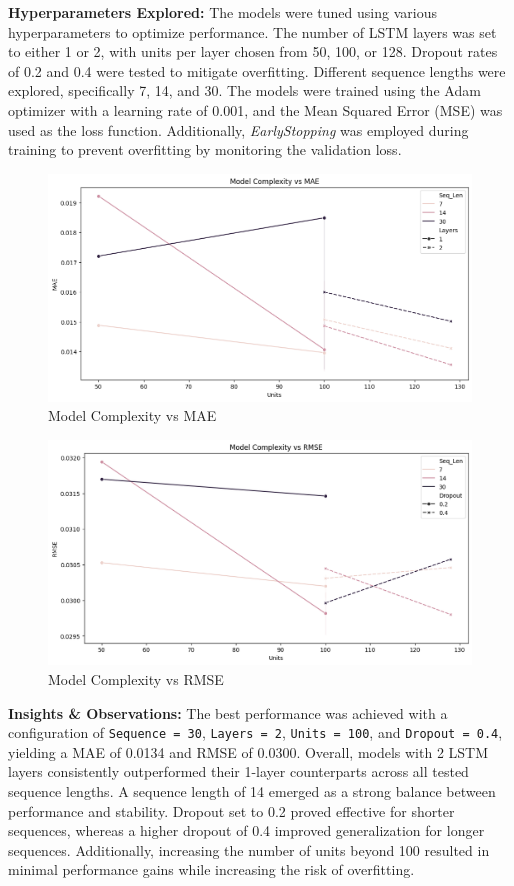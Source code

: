 \documentclass[conference]{IEEEtran}
\begin{document}
\textbf{Hyperparameters Explored:} The models were tuned using various hyperparameters to optimize performance. The number of LSTM layers was set to either 1 or 2, with units per layer chosen from 50, 100, or 128. Dropout rates of 0.2 and 0.4 were tested to mitigate overfitting. Different sequence lengths were explored, specifically 7, 14, and 30. The models were trained using the Adam optimizer with a learning rate of 0.001, and the Mean Squared Error (MSE) was used as the loss function. Additionally, \textit{EarlyStopping} was employed during training to prevent overfitting by monitoring the validation loss.


\begin{figure}[H]
\centering
\includegraphics[width=0.95\linewidth]{model_complexity_vs_mae.png}
\caption{Model Complexity vs MAE}
\label{fig:model_complexity_mae}
\end{figure}

\begin{figure}[H]
\centering
\includegraphics[width=0.95\linewidth]{model_complexity_vs_rmse.png}
\caption{Model Complexity vs RMSE}
\label{fig:model_complexity_rmse}
\end{figure}

\textbf{Insights \& Observations:} The best performance was achieved with a configuration of \texttt{Sequence = 30}, \texttt{Layers = 2}, \texttt{Units = 100}, and \texttt{Dropout = 0.4}, yielding a MAE of 0.0134 and RMSE of 0.0300. Overall, models with 2 LSTM layers consistently outperformed their 1-layer counterparts across all tested sequence lengths. A sequence length of 14 emerged as a strong balance between performance and stability. Dropout set to 0.2 proved effective for shorter sequences, whereas a higher dropout of 0.4 improved generalization for longer sequences. Additionally, increasing the number of units beyond 100 resulted in minimal performance gains while increasing the risk of overfitting.
\end{document}
